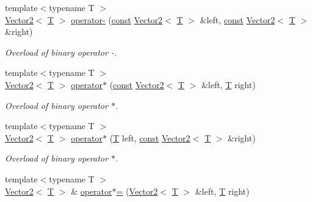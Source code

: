 \begin{DoxyCompactItemize}
{\footnotesize template$<$typename T $>$ }\\\hyperlink{classsf_1_1_vector2}{Vector2}$<$ \hyperlink{curses_8priv_8h_a5ef253115820acf7d27f3c5c3b02a0f0}{T} $>$ \hyperlink{classsf_1_1_vector2_ad027adae53ec547a86c20deeb05c9e85}{operator-\/} (\hyperlink{term__entry_8h_a57bd63ce7f9a353488880e3de6692d5a}{const} \hyperlink{classsf_1_1_vector2}{Vector2}$<$ \hyperlink{curses_8priv_8h_a5ef253115820acf7d27f3c5c3b02a0f0}{T} $>$ \&left, \hyperlink{term__entry_8h_a57bd63ce7f9a353488880e3de6692d5a}{const} \hyperlink{classsf_1_1_vector2}{Vector2}$<$ \hyperlink{curses_8priv_8h_a5ef253115820acf7d27f3c5c3b02a0f0}{T} $>$ \&right)
\begin{DoxyCompactList}\small\item\em Overload of binary operator -\/. \end{DoxyCompactList}\item 
{\footnotesize template$<$typename T $>$ }\\\hyperlink{classsf_1_1_vector2}{Vector2}$<$ \hyperlink{curses_8priv_8h_a5ef253115820acf7d27f3c5c3b02a0f0}{T} $>$ \hyperlink{classsf_1_1_vector2_a5f48ca928995b41c89f155afe8d16b02}{operator$\ast$} (\hyperlink{term__entry_8h_a57bd63ce7f9a353488880e3de6692d5a}{const} \hyperlink{classsf_1_1_vector2}{Vector2}$<$ \hyperlink{curses_8priv_8h_a5ef253115820acf7d27f3c5c3b02a0f0}{T} $>$ \&left, \hyperlink{curses_8priv_8h_a5ef253115820acf7d27f3c5c3b02a0f0}{T} right)
\begin{DoxyCompactList}\small\item\em Overload of binary operator $\ast$. \end{DoxyCompactList}\item 
{\footnotesize template$<$typename T $>$ }\\\hyperlink{classsf_1_1_vector2}{Vector2}$<$ \hyperlink{curses_8priv_8h_a5ef253115820acf7d27f3c5c3b02a0f0}{T} $>$ \hyperlink{classsf_1_1_vector2_ad8b3e1cf7b156a984bc1427539ca8605}{operator$\ast$} (\hyperlink{curses_8priv_8h_a5ef253115820acf7d27f3c5c3b02a0f0}{T} left, \hyperlink{term__entry_8h_a57bd63ce7f9a353488880e3de6692d5a}{const} \hyperlink{classsf_1_1_vector2}{Vector2}$<$ \hyperlink{curses_8priv_8h_a5ef253115820acf7d27f3c5c3b02a0f0}{T} $>$ \&right)
\begin{DoxyCompactList}\small\item\em Overload of binary operator $\ast$. \end{DoxyCompactList}\item 
{\footnotesize template$<$typename T $>$ }\\\hyperlink{classsf_1_1_vector2}{Vector2}$<$ \hyperlink{curses_8priv_8h_a5ef253115820acf7d27f3c5c3b02a0f0}{T} $>$ \& \hyperlink{classsf_1_1_vector2_abea24cb28c0d6e2957e259ba4e65d70e}{operator$\ast$=} (\hyperlink{classsf_1_1_vector2}{Vector2}$<$ \hyperlink{curses_8priv_8h_a5ef253115820acf7d27f3c5c3b02a0f0}{T} $>$ \&left, \hyperlink{curses_8priv_8h_a5ef253115820acf7d27f3c5c3b02a0f0}{T} right)

\end{DoxyCompactItemize}
